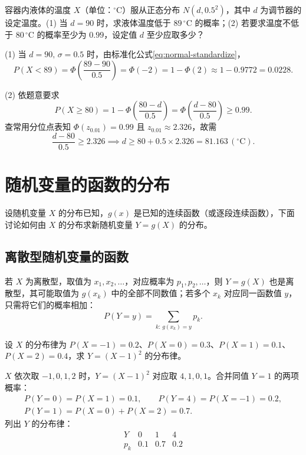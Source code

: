 \begin{example}[title={温度控制器的设定值}]
\label{eg:temp-regulator}
容器内液体的温度 $X$（单位：$^\circ\mathrm{C}$）服从正态分布 $N(d,0.5^2)$，其中 $d$ 为调节器的设定温度。(1) 当 $d=90$ 时，求液体温度低于 $89\,^\circ\mathrm{C}$ 的概率；(2) 若要求温度不低于 $80\,^\circ\mathrm{C}$ 的概率至少为 $0.99$，设定值 $d$ 至少应取多少？
\begin{solution}
(1) 当 $d=90,\,\sigma=0.5$ 时，由标准化公式\eqref{eq:normal-standardize}，
\[
  P(X<89)=\Phi\left(\frac{89-90}{0.5}\right)=\Phi(-2)=1-\Phi(2)\approx 1-0.9772=0.0228.
\]

(2) 依题意要求
\[
  P(X\ge 80)=1-\Phi\left(\frac{80-d}{0.5}\right)=\Phi\left(\frac{d-80}{0.5}\right)\ge 0.99.
\]
查常用分位点表知 $\Phi(z_{0.01})=0.99$ 且 $z_{0.01}\approx 2.326$，故需
\[
  \frac{d-80}{0.5}\ge 2.326\implies d\ge 80+0.5\times 2.326=81.163\,(^\circ\mathrm{C}).
\]
\end{solution}
\end{example}

\section{随机变量的函数的分布}
\label{sec:univariate-transform}

设随机变量 $X$ 的分布已知，$g(x)$ 是已知的连续函数（或逐段连续函数），下面讨论如何由 $X$ 的分布求新随机变量 $Y=g(X)$ 的分布。

\subsection{离散型随机变量的函数}

若 $X$ 为离散型，取值为 $x_1,x_2,\ldots$，对应概率为 $p_1,p_2,\ldots$，则 $Y=g(X)$ 也是离散型，其可能取值为 $g(x_k)$ 中的全部不同数值；若多个 $x_k$ 对应同一函数值 $y$，只需将它们的概率相加：
\[
  P(Y=y)=\sum_{k:\,g(x_k)=y}p_k.
\]

\begin{example}[title={离散型函数的同值合并}]
\label{eg:discrete-transform}
设 $X$ 的分布律为 $P(X=-1)=0.2$、$P(X=0)=0.3$、$P(X=1)=0.1$、$P(X=2)=0.4$，求 $Y=(X-1)^2$ 的分布律。
\begin{solution}
$X$ 依次取 $-1,0,1,2$ 时，$Y=(X-1)^2$ 对应取 $4,1,0,1$。合并同值 $Y=1$ 的两项概率：
\[
\begin{gathered}
  P(Y=0)=P(X=1)=0.1,\qquad P(Y=4)=P(X=-1)=0.2,\\
  P(Y=1)=P(X=0)+P(X=2)=0.7.
\end{gathered}
\]
列出 $Y$ 的分布律：
\[
\begin{array}{c|ccc}
  Y & 0 & 1 & 4 \\ \hline
  p_k & 0.1 & 0.7 & 0.2
\end{array}
\]
\end{solution}
\end{example}

